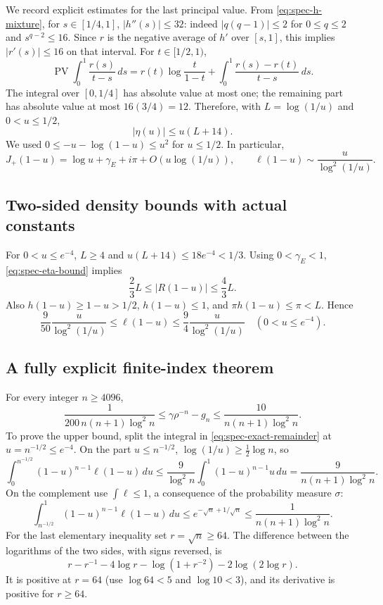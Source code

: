 We record explicit estimates for the last principal value.  From
\eqref{eq:spec-h-mixture}, for $s\in[1/4,1]$,
$|h''(s)|\le32$: indeed $|q(q-1)|\le2$ for $0\le q\le2$ and
$s^{q-2}\le16$.  Since $r$ is the negative average of $h'$ over
$[s,1]$, this implies $|r'(s)|\le16$ on that interval.  For
$t\in[1/2,1)$,
\[
 \operatorname{PV}\int_0^1\frac{r(s)}{t-s}\,ds
 =r(t)\log\frac{t}{1-t}
       +\int_0^1\frac{r(s)-r(t)}{t-s}\,ds.
\]
The integral over $[0,1/4]$ has absolute value at most one; the
remaining part has absolute value at most $16(3/4)=12$.  Therefore,
with $L=\log(1/u)$ and $0<u\le1/2$,
\begin{equation}
 |\eta(u)|\le u(L+14).
 \label{eq:spec-eta-bound}
\end{equation}
We used $0\le-u-\log(1-u)\le u^2$ for $u\le1/2$.
In particular,
\begin{equation}
 J_+(1-u)=\log u+\gamma_{\!E}+i\pi
                  +O(u\log(1/u)),
 \qquad
 \ell(1-u)\sim\frac{u}{\log^2(1/u)}.
 \label{eq:spec-local-equivalence}
\end{equation}

\subsection{Two-sided density bounds with actual constants}

For $0<u\le e^{-4}$, $L\ge4$ and
$u(L+14)\le18e^{-4}<1/3$.  Using $0<\gamma_{\!E}<1$,
\eqref{eq:spec-eta-bound} implies
\[
 \frac23L\le |R(1-u)|\le\frac43L.
\]
Also $h(1-u)\ge1-u>1/2$, $h(1-u)\le1$, and
$\pi h(1-u)\le\pi<L$.  Hence
\begin{equation}
 \boxed{\qquad
 \frac9{50}\frac{u}{\log^2(1/u)}
 \le\ell(1-u)\le
 \frac94\frac{u}{\log^2(1/u)}
 \quad(0<u\le e^{-4}).
 \qquad}
 \label{eq:spec-explicit-density}
\end{equation}

\subsection{A fully explicit finite-index theorem}

For every integer $n\ge4096$,
\begin{equation}
 \boxed{\qquad
 \frac{1}{200\,n(n+1)\log^2n}
 \le \gamma\rho^{-n}-g_n
 \le\frac{10}{n(n+1)\log^2n}.
 \qquad}
 \label{eq:spec-explicit-n}
\end{equation}
To prove the upper bound, split the integral in
\eqref{eq:spec-exact-remainder} at $u=n^{-1/2}\le e^{-4}$.
On the part $u\le n^{-1/2}$, $\log(1/u)\ge\tfrac12\log n$, so
\[
 \int_0^{n^{-1/2}}(1-u)^{n-1}\ell(1-u)\,du
 \le\frac9{\log^2n}\int_0^1(1-u)^{n-1}u\,du
 =\frac9{n(n+1)\log^2n}.
\]
On the complement use $\int\ell\le1$, a consequence of the
probability measure $\sigma$:
\[
 \int_{n^{-1/2}}^1(1-u)^{n-1}\ell(1-u)\,du
 \le e^{-\sqrt n+1/\sqrt n}
 \le\frac1{n(n+1)\log^2n}.
\]
For the last elementary inequality set $r=\sqrt n\ge64$.  The
difference between the logarithms of the two sides, with signs reversed,
is
\[
 r-r^{-1}-4\log r-\log(1+r^{-2})-2\log(2\log r).
\]
It is positive at $r=64$ (use $\log64<5$ and $\log10<3$), and its
derivative is positive for $r\ge64$.

